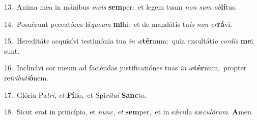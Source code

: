 {\numbfont\textcolor{\numbcolor}{13.}}~Anima mea in mánibus \textit{me}\-\textit{is} \textbf{sem}\-per:~\star et legem tuam \textit{non} \textit{sum} \textit{ob}\-\textbf{lí}tus.\par
{\numbfont\textcolor{\numbcolor}{14.}}~Posuérunt peccatóres lá\-\textit{que}\-\textit{um} \textbf{mi}\-hi:~\star et de mandátis tu\textit{is} \textit{non} \textit{er}\-\textbf{rá}vi.\par
{\numbfont\textcolor{\numbcolor}{15.}}~Hereditáte acquisívi testimónia tua \textit{in} \textit{æ}\-\textbf{tér}num:~\star quia exsultáti\textit{o} \textit{cor}\-\textit{dis} \textbf{me}\-i sunt.\par
{\numbfont\textcolor{\numbcolor}{16.}}~Inclinávi cor meum ad faciéndas justificatiónes tuas \textit{in} \textit{æ}\-\textbf{tér}num,~\star propter re\-\textit{tri}\-\textit{bu}\textit{ti}\textbf{ó}nem.\par
{\numbfont\textcolor{\numbcolor}{17.}}~Glória Pa\-\textit{tri}\-, \textit{et} \textbf{Fí}\-lio,~\star et Spi\-\textit{rí}\-\textit{tu}\textit{i} \textbf{Sanc}\-to.\par
{\numbfont\textcolor{\numbcolor}{18.}}~Sicut erat in princípio, et \textit{nunc}\-, \textit{et} \textbf{sem}\-per,~\star et in sǽcula sæ\-\textit{cu}\-\textit{ló}\textit{rum}. \textbf{A}\-men.\par
